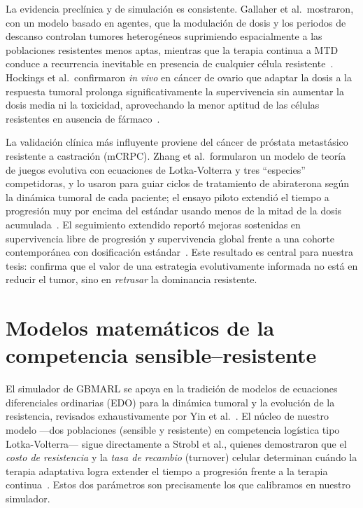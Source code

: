 La evidencia preclínica y de simulación es consistente. Gallaher et al.\ mostraron, con un modelo basado en agentes, que la modulación de dosis y los periodos de descanso controlan tumores heterogéneos suprimiendo espacialmente a las poblaciones resistentes menos aptas, mientras que la terapia continua a MTD conduce a recurrencia inevitable en presencia de cualquier célula resistente~\cite{Gallaher2017}. Hockings et al.\ confirmaron \emph{in vivo} en cáncer de ovario que adaptar la dosis a la respuesta tumoral prolonga significativamente la supervivencia sin aumentar la dosis media ni la toxicidad, aprovechando la menor aptitud de las células resistentes en ausencia de fármaco~\cite{Hockings2025}.

La validación clínica más influyente proviene del cáncer de próstata metastásico resistente a castración (mCRPC). Zhang et al.\ formularon un modelo de teoría de juegos evolutiva con ecuaciones de Lotka-Volterra y tres ``especies'' competidoras, y lo usaron para guiar ciclos de tratamiento de abiraterona según la dinámica tumoral de cada paciente; el ensayo piloto extendió el tiempo a progresión muy por encima del estándar usando menos de la mitad de la dosis acumulada~\cite{Zhang2017}. El seguimiento extendido reportó mejoras sostenidas en supervivencia libre de progresión y supervivencia global frente a una cohorte contemporánea con dosificación estándar~\cite{Zhang2022}. Este resultado es central para nuestra tesis: confirma que el valor de una estrategia evolutivamente informada no está en reducir el tumor, sino en \emph{retrasar} la dominancia resistente.

\section{Modelos matemáticos de la competencia sensible--resistente}
\label{sec:modelos-matematicos}

El simulador de GBMARL se apoya en la tradición de modelos de ecuaciones diferenciales ordinarias (EDO) para la dinámica tumoral y la evolución de la resistencia, revisados exhaustivamente por Yin et al.~\cite{Yin2019}. El núcleo de nuestro modelo ---dos poblaciones (sensible y resistente) en competencia logística tipo Lotka-Volterra--- sigue directamente a Strobl et al., quienes demostraron que el \emph{costo de resistencia} y la \emph{tasa de recambio} (turnover) celular determinan cuándo la terapia adaptativa logra extender el tiempo a progresión frente a la terapia continua~\cite{Strobl2020}. Estos dos parámetros son precisamente los que calibramos en nuestro simulador.

